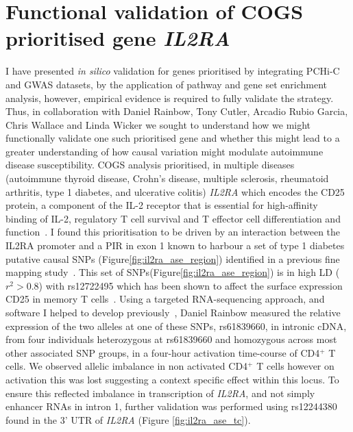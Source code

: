 \documentclass[a4paper,11pt]{report}
\begin{document}
\section{Functional validation of COGS prioritised gene \textit{IL2RA}}
\label{section:il2ra}
I have presented \textit{in silico} validation for genes prioritised by integrating PCHi-C and GWAS datasets, by the application of pathway and gene set enrichment analysis, however, empirical evidence is required to fully validate the strategy. Thus, in collaboration with Daniel Rainbow, Tony Cutler, Arcadio Rubio Garcia, Chris Wallace and Linda Wicker we sought to understand how we might functionally validate one such prioritised gene and whether this might lead to a greater understanding of how causal variation might modulate autoimmune disease susceptibility. COGS analysis prioritised, in multiple diseases (autoimmune thyroid disease, Crohn's disease, multiple sclerosis, rheumatoid arthritis, type 1 diabetes, and ulcerative colitis) \textit{IL2RA} which encodes the CD25 protein,  a component of the IL-2 receptor that is essential for high-affinity binding of IL-2, regulatory T cell survival and T effector cell differentiation and function~\citep{LiaoLinLeonard2013}. I found this prioritisation to be driven by an interaction between the IL2RA promoter and a PIR in exon 1 known to harbour a set of type 1 diabetes putative causal SNPs (Figure\ref{fig:il2ra_ase_region}) identified in a previous fine mapping study~\citep{WallaceCutlerPontikosEtAl2015}. This  set of SNPs(Figure\ref{fig:il2ra_ase_region}) is in high LD ($r^{2} > 0.8$) with rs12722495 which has been shown to affect the surface expression CD25 in memory T cells~\citep{DendrouPlagnolFungEtAl2009}. Using a targeted RNA-sequencing approach, and software I helped to develop previously~\citep{RainbowYangBurrenEtAl2015}, Daniel Rainbow measured the relative expression of the two alleles at one of these SNPs, rs61839660, in intronic cDNA, from four individuals heterozygous at rs61839660 and homozygous across most other associated SNP groups, in a four-hour activation time-course of CD4$^{+}$ T cells. We observed allelic imbalance in non activated CD4$^{+}$ T cells however on activation this was lost suggesting a context specific effect within this locus. To ensure this reflected imbalance in transcription of \textit{IL2RA}, and not simply enhancer RNAs in intron 1,  further validation was performed using rs12244380 found in the 3' UTR of \textit{IL2RA} (Figure \ref{fig:il2ra_ase_tc}). 
\end{document}
